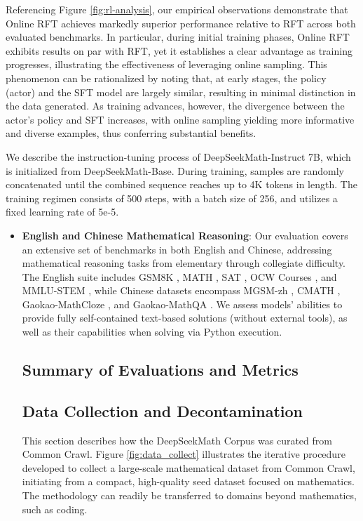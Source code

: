 \begin{itemize}[topsep=0pt]
Referencing Figure \ref{fig:rl-analysis}, our empirical observations demonstrate that Online RFT achieves markedly superior performance relative to RFT across both evaluated benchmarks. In particular, during initial training phases, Online RFT exhibits results on par with RFT, yet it establishes a clear advantage as training progresses, illustrating the effectiveness of leveraging online sampling. This phenomenon can be rationalized by noting that, at early stages, the policy (actor) and the SFT model are largely similar, resulting in minimal distinction in the data generated. As training advances, however, the divergence between the actor’s policy and SFT increases, with online sampling yielding more informative and diverse examples, thus conferring substantial benefits.

We describe the instruction-tuning process of DeepSeekMath-Instruct 7B, which is initialized from DeepSeekMath-Base. During training, samples are randomly concatenated until the combined sequence reaches up to 4K tokens in length. The training regimen consists of 500 steps, with a batch size of 256, and utilizes a fixed learning rate of 5e-5.

\begin{itemize}[topsep=0pt]
    \item \textbf{English and Chinese Mathematical Reasoning}: Our evaluation covers an extensive set of benchmarks in both English and Chinese, addressing mathematical reasoning tasks from elementary through collegiate difficulty. The English suite includes GSM8K \citep{gsm8k}, MATH \citep{MATH}, SAT \citep{llemma}, OCW Courses \citep{minerva}, and MMLU-STEM \citep{mmlu}, while Chinese datasets encompass MGSM-zh \citep{mgsm}, CMATH \citep{wei2023cmath}, Gaokao-MathCloze \citep{agieval}, and Gaokao-MathQA \citep{agieval}. We assess models’ abilities to provide fully self-contained text-based solutions (without external tools), as well as their capabilities when solving via Python execution.

\subsection{Summary of Evaluations and Metrics}

\subsection{Data Collection and Decontamination} This section describes how the DeepSeekMath Corpus was curated from Common Crawl. Figure \ref{fig:data_collect} illustrates the iterative procedure developed to collect a large-scale mathematical dataset from Common Crawl, initiating from a compact, high-quality seed dataset focused on mathematics. The methodology can readily be transferred to domains beyond mathematics, such as coding.


\end{itemize}
\end{itemize}
